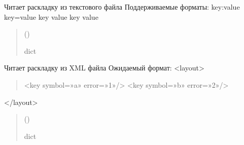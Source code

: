 \documentclass[a4paper,11pt,russian,openany,oneside]{sphinxmanual}
\begin{document}

\begin{savenotes}\begin{fulllineitems}
\label{\detokenize{scan_module:scan_module.read_layout._read_text_layout}}
\pysigstartsignatures
\pysiglinewithargsret
{}
{}
{}
\pysigstopsignatures
\sphinxAtStartPar
Читает раскладку из текстового файла
Поддерживаемые форматы:
\sphinxhyphen{} key:value
\sphinxhyphen{} key=value
\sphinxhyphen{} key value
\sphinxhyphen{} key       value
\begin{quote}\begin{description}
\sphinxAtStartPar
{} ()

\sphinxAtStartPar
dict

\end{description}\end{quote}

\end{fulllineitems}\end{savenotes}


\begin{savenotes}\begin{fulllineitems}
\label{\detokenize{scan_module:scan_module.read_layout._read_xml_layout}}
\pysigstartsignatures
\pysiglinewithargsret
{}
{}
{}
\pysigstopsignatures
\sphinxAtStartPar
Читает раскладку из XML файла
Ожидаемый формат:
<layout>
\begin{quote}

\sphinxAtStartPar
<key symbol=»a» error=»1»/>
<key symbol=»b» error=»2»/>
\end{quote}

\sphinxAtStartPar
</layout>
\begin{quote}\begin{description}
\sphinxAtStartPar
{} ()

\sphinxAtStartPar
dict

\end{description}\end{quote}

\end{fulllineitems}\end{savenotes}
\end{document}
